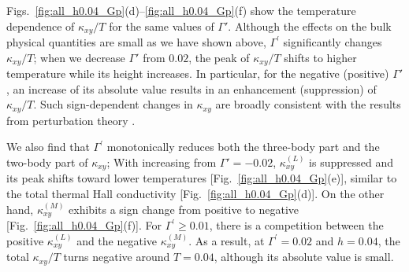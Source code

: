 \documentclass[twocolumn,superscriptaddress,showpacs, longbibliography, aps, prb]{revtex4-2}
\newcommand{\red}[1]{\textcolor{red}{#1}}
\newcommand{\blue}[1]{\textcolor{blue}{#1}}
\newcommand{\orange}[1]{\textcolor{orange}{#1}}
\begin{document}
\begin{figure}
{  %
  }
  \label{fig:all_h0.08_Gp}
\end{figure}

Figs.~\ref{fig:all_h0.04_Gp}(d)--\ref{fig:all_h0.04_Gp}(f) show the temperature dependence of $\kappa_{xy}/T$ %
for the same values of $\Gamma'$. Although the effects %
on the %
bulk physical quantities are small as we have shown above, 
$\Gamma^{\prime}$ %
significantly changes $\kappa_{xy}/T$; when we decrease %
$\Gamma'$ from $0.02$, the peak of $\kappa_{xy}/T$ %
shifts to higher temperature %
while its height increases.
In particular, for the negative (positive) $\Gamma'$, 
an
increase of its absolute value %
results in an enhancement (suppression) of $\kappa_{xy}/T$.
Such sign-dependent changes %
in $\kappa_{xy}$ are %
broadly consistent with the 
results from perturbation theory \cite{TakikawaF2020}. 

We also find that $\Gamma^{\prime}$ monotonically %
reduces both the three-body part and the two-body part of $\kappa_{xy}$;
With increasing %
from $\Gamma'=-0.02$, $\kappa_{xy}^{(L)}$ is suppressed and its peak shifts 
toward lower temperatures %
[Fig.~\ref{fig:all_h0.04_Gp}(e)], similar to the total thermal Hall conductivity [Fig.~\ref{fig:all_h0.04_Gp}(d)].
On the other hand, $\kappa_{xy}^{(M)}$ exhibits %
a sign change from %
positive to negative [Fig.~\ref{fig:all_h0.04_Gp}(f)]. 
For $\Gamma^{\prime}\geq0.01$, 
there is a competition between the positive $\kappa_{xy}^{(L)}$ and the negative $\kappa_{xy}^{(M)}$.
As a result, %
at $\Gamma^{\prime} = 0.02$ and $h=0.04$, %
the total $\kappa_{xy}/T$ %
turns negative around $T=0.04$, 
although its absolute value is small. 
\end{document}
